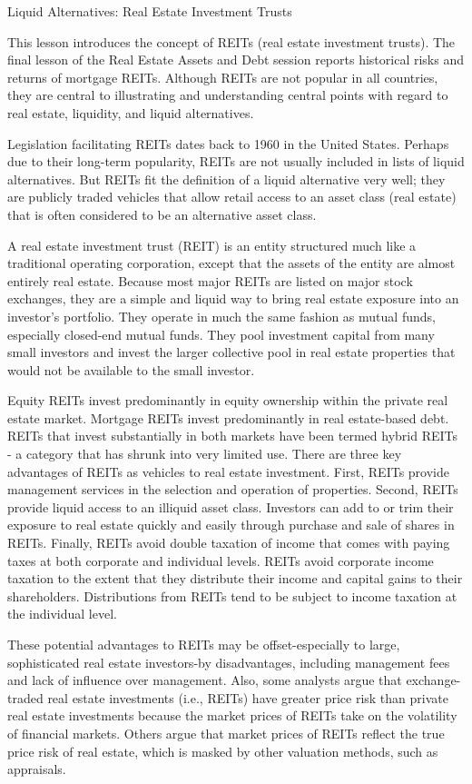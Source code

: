\documentclass[11pt]{article}
\begin{document}
Liquid Alternatives: Real Estate Investment Trusts

This lesson introduces the concept of REITs (real estate investment trusts). The final lesson of the Real Estate Assets and Debt session reports historical risks and returns of mortgage REITs. Although REITs are not popular in all countries, they are central to illustrating and understanding central points with regard to real estate, liquidity, and liquid alternatives.

Legislation facilitating REITs dates back to 1960 in the United States. Perhaps due to their long-term popularity, REITs are not usually included in lists of liquid alternatives. But REITs fit the definition of a liquid alternative very well; they are publicly traded vehicles that allow retail access to an asset class (real estate) that is often considered to be an alternative asset class.

A real estate investment trust (REIT) is an entity structured much like a traditional operating corporation, except that the assets of the entity are almost entirely real estate. Because most major REITs are listed on major stock exchanges, they are a simple and liquid way to bring real estate exposure into an investor's portfolio. They operate in much the same fashion as mutual funds, especially closed-end mutual funds. They pool investment capital from many small investors and invest the larger collective pool in real estate properties that would not be available to the small investor.

Equity REITs invest predominantly in equity ownership within the private real estate market. Mortgage REITs invest predominantly in real estate-based debt. REITs that invest substantially in both markets have been termed hybrid REITs - a category that has shrunk into very limited use. There are three key advantages of REITs as vehicles to real estate investment. First, REITs provide management services in the selection and operation of properties. Second, REITs provide liquid access to an illiquid asset class. Investors can add to or trim their exposure to real estate quickly and easily through purchase and sale of shares in REITs. Finally, REITs avoid double taxation of income that comes with paying taxes at both corporate and individual levels. REITs avoid corporate income taxation to the extent that they distribute their income and capital gains to their shareholders. Distributions from REITs tend to be subject to income taxation at the individual level.

These potential advantages to REITs may be offset-especially to large, sophisticated real estate investors-by disadvantages, including management fees and lack of influence over management. Also, some analysts argue that exchange-traded real estate investments (i.e., REITs) have greater price risk than private real estate investments because the market prices of REITs take on the volatility of financial markets. Others argue that market prices of REITs reflect the true price risk of real estate, which is masked by other valuation methods, such as appraisals.
\end{document}
